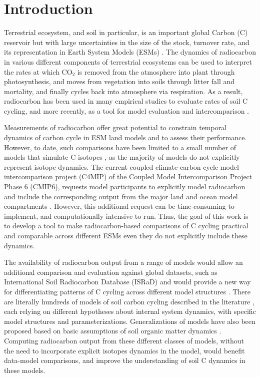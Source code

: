\documentclass[11pt,a4paper]{article}
\begin{document}
\newpage

\section{Introduction}
Terrestrial ecosystem, and soil in particular, is an important global Carbon (C) reservoir but with large uncertainties in the size of the stock, turnover rate, and its representation in Earth System Models (ESMs) \citep{Luo2016,Sulman2018B}. The dynamics of radiocarbon in various different components of terrestrial ecosystems can be used to interpret the rates at which CO$_2$ is removed from the atmosphere into plant through photosynthesis, and moves from vegetation into soils through litter fall and mortality, and finally cycles back into atmosphere via respiration. As a result, radiocarbon has been used in many empirical studies to evaluate rates of soil C cycling, and more recently, as a tool for model evaluation \citep{Chen2009JGR,Dwivedi2018SBB,Ahrens2015SBB} and intercomparison \citep{He2016}. 

Measurements of radiocarbon offer great potential to constrain temporal dynamics of carbon cycle in ESM land models and to assess their performance. However, to date, such comparisons have been limited to a small number of models that simulate C isotopes \citep[e.g.][]{Koven2013, Tifafi2018,Chen2009JGR}, as the majority of models do not explicitly represent isotope dynamics. The current coupled climate-carbon cycle model intercomparison project (C4MIP) of the Coupled Model Intercomparison Project Phase 6 (CMIP6), requests model participants to explicitly model radiocarbon and include the corresponding output from the major land and ocean model compartments \citep{Jones2016, Graven2017}. However, this additional request can be time-consuming to implement, and computationally intensive to run. Thus, the goal of this work is to develop a tool to make radiocarbon-based comparisons of C cycling practical and comparable across different ESMs even they do not explicitly include these dynamics.

The availability of radiocarbon output from a range of models would allow an additional comparison and evaluation against global datasets, such as International Soil Radiocarbon Database (ISRaD) \citep{He2016, Mathieu2015} and would provide a new way for differentiating patterns of C cycling across different model structures \citep{Sierra2014}. There are literally hundreds of models of soil carbon cycling described in the literature \citep{Manzoni2009SBB}, each relying on different hypotheses about internal system dynamics, with specific model structures and parameterizations. Generalizations of models have also been proposed based on basic assumptions of soil organic matter dynamics \citep{Sierra2015}. Computing radiocarbon output from these different classes of models, without the need to incorporate explicit isotopes dynamics in the model, would benefit data-model comparisons, and improve the understanding of soil C dynamics in these models.
\end{document}
